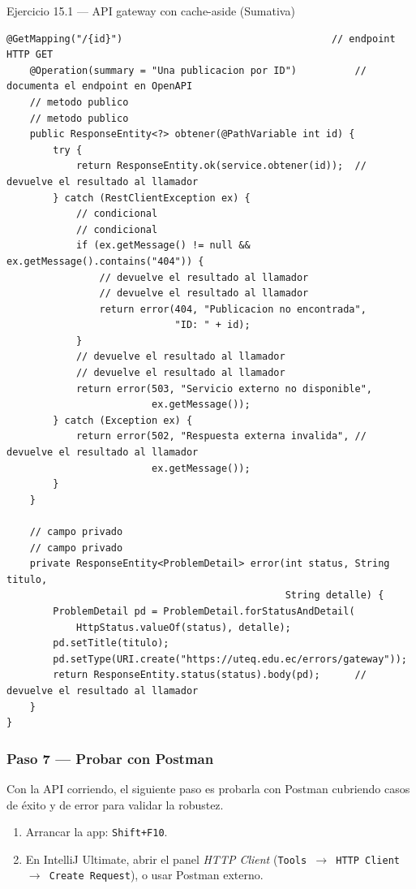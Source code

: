 \documentclass[11pt,a4paper,openany]{book}
\begin{document}
\begin{cajaejercicio}{Ejercicio 15.1 --- API gateway con cache-aside (Sumativa)}
\begin{lstlisting}[style=java,caption={PostController.java},label=lst:15.19]
    @GetMapping("/{id}")                                    // endpoint HTTP GET
    @Operation(summary = "Una publicacion por ID")          // documenta el endpoint en OpenAPI
    // metodo publico
    // metodo publico
    public ResponseEntity<?> obtener(@PathVariable int id) {
        try {
            return ResponseEntity.ok(service.obtener(id));  // devuelve el resultado al llamador
        } catch (RestClientException ex) {
            // condicional
            // condicional
            if (ex.getMessage() != null && ex.getMessage().contains("404")) {
                // devuelve el resultado al llamador
                // devuelve el resultado al llamador
                return error(404, "Publicacion no encontrada",
                             "ID: " + id);
            }
            // devuelve el resultado al llamador
            // devuelve el resultado al llamador
            return error(503, "Servicio externo no disponible",
                         ex.getMessage());
        } catch (Exception ex) {
            return error(502, "Respuesta externa invalida", // devuelve el resultado al llamador
                         ex.getMessage());
        }
    }

    // campo privado
    // campo privado
    private ResponseEntity<ProblemDetail> error(int status, String titulo,
                                                String detalle) {
        ProblemDetail pd = ProblemDetail.forStatusAndDetail(
            HttpStatus.valueOf(status), detalle);
        pd.setTitle(titulo);
        pd.setType(URI.create("https://uteq.edu.ec/errors/gateway"));
        return ResponseEntity.status(status).body(pd);      // devuelve el resultado al llamador
    }
}
\end{lstlisting}

\subsubsection*{Paso 7 --- Probar con Postman}

Con la API corriendo, el siguiente paso es probarla con
Postman cubriendo casos de éxito y de error para validar la
robustez.


\begin{enumerate}
\item Arrancar la app: \texttt{Shift+F10}.
\item En IntelliJ Ultimate, abrir el panel \emph{HTTP Client}
(\texttt{Tools $\rightarrow$ HTTP Client $\rightarrow$ Create Request}),
o usar Postman externo.


\end{enumerate}
\end{cajaejercicio}
\end{document}
